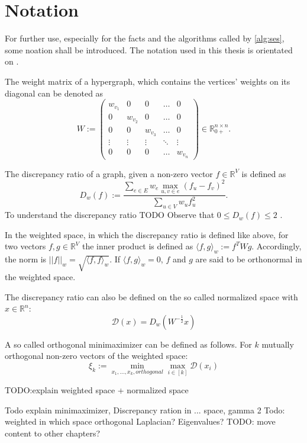 \chapter{Notation}\label{chapter:notation}
For further use, especially for the facts and the algorithms called by \cref{alg:ses}, some noation shall be introduced.
The notation used in this thesis is orientated on \cite{ChanLTZ16}.



The weight matrix of a hypergraph, which contains the vertices' weights on its diagonal can be denoted as \begin{equation}
	W := 
	\begin{pmatrix}
	w_{v_1} & 0 & 0&\dots &0 \\
	0 & w_{v_2} & 0 & \ldots & 0 \\
	0 & 0 & w_{v_3} & \ldots & 0 \\
	\vdots & \vdots & \vdots & \ddots & \vdots \\
	0 &0&0& \ldots  & w_{v_n}
	\end{pmatrix} \in \mathbb{R}_{0+}^{n \times n} .
\end{equation} 

The discrepancy ratio of a graph, given a non-zero vector $f \in \mathbb{R}^V$ is defined as \begin{equation}\label{eq:discrepancy_ratio}
D_w(f) := \frac{\sum_{e\in E} w_e \max_{u,v\in e}(f_u - f_v)^2}{\sum_{u\in V} w_u f_u^2}.
\end{equation} To understand the discrepancy ratio TODO
 Observe that $0\le D_w(f) \le 2 $ \cite{ChanLTZ16}.

In the weighted space, in which the discrepancy ratio is defined like above, for two vectors $f, g \in \mathbb{R}^V$ the inner product is defined as $ \langle f,g \rangle_w := f^T W g$. Accordingly, the norm is $||f||_w = \sqrt{ \langle f,f \rangle_w}$.
If $ \langle f,g \rangle_w   = 0 $, $f$ and $g$ are said to be orthonormal in the weighted space. 

The discrepancy ratio can also be defined on the so called normalized space with $x\in \mathbb{R}^n$:
\begin{equation}
\mathcal{D}(x) = D_w(W^{-\frac{1}{2}}x)
\end{equation}

A so called orthogonal minimaximizer can be defined as follows. For $k$ mutually orthogonal non-zero vectors of the weighted space:
\begin{equation}\label{eq:xi}
	\xi_k := \min_{x_1, \ldots , x_k, orthogonal} \max_{i \in [k]} \mathcal{D}(x_i)
\end{equation}

TODO:explain weighted space + normalized space 

Todo explain minimaximizer, Discrepancy ration in ... space, gamma 2
Todo: weighted in which space orthogonal
Laplacian? Eigenvalues?
TODO: move content to other chapters?



